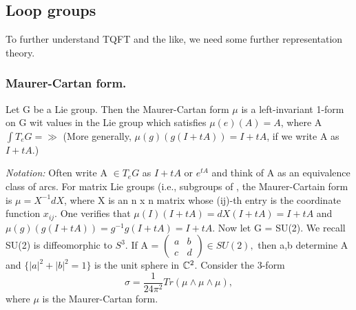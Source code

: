 \subsection{Loop groups}
To further understand TQFT and the like, we need some further representation theory.
\subsubsection{Maurer-Cartan form.}
\begin{definition}
 Let G be a Lie group. Then the Maurer-Cartan form $\mu$ is a left-invariant 1-form on G wit values in the Lie group \gg which
 satisfies $\mu(e)(A) = A$, where A$\int T_{e}G= \gg$ (More generally, $\mu(g)(g(I+tA)) = I+tA$, if we write A as $I
 +tA$.)
\end{definition}
\textit{Notation:} Often write A $\in T_eG$ as $I+tA$ or $e^{tA}$ and think of A as an equivalence class of arcs. 
For matrix Lie groups (i.e., subgroups of \Glc, the Maurer-Cartain form is $\mu = X^{-1}dX$, where X is an n x n matrix 
whose (ij)-th entry is the coordinate function $x_{ij}$.
One verifies that $\mu(I)(I + tA) = dX(I+tA) = I + tA$ and $\mu(g)(g(I+tA)) = g^{-1}g(I+tA) = I+tA$.
Now let G = SU(2). We recall SU(2) is diffeomorphic to $S^3$. If A = $\left(\begin{matrix}
                                                                      a & b \\
                                                                      c & d
                                                                     \end{matrix}\right)\in SU(2),$
  then a,b determine A and $\lbrace|a|^2 + |b|^2 = 1 \rbrace$ is the unit sphere in $\mathbb{C}^{2}$.
 Consider the 3-form 
 \begin{equation*}
  \sigma = \dfrac{1}{24 \pi^{2}} Tr(\mu \wedge \mu \wedge \mu),
 \end{equation*}
where $\mu$ is the Maurer-Cartan form. 
